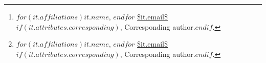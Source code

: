\author{
  $for(by-author/allbutlast)$
 $it.name.literal$$if(it.orcid)$~$endif$
 \thanks{$for(it.affiliations)$$it.name$, $endfor$%
{\footnotesize \url{$it.email$}}$if(it.attributes.corresponding)$, Corresponding author.$endif$.},
 $endfor$
 $for(by-author/last)$
 $it.name.literal$$if(it.orcid)$~$endif$
 \thanks{$for(it.affiliations)$$it.name$, $endfor$%
{\footnotesize \url{$it.email$}}$if(it.attributes.corresponding)$, Corresponding author.$endif$.}
 $endfor$
 \\~
 }

\date{}


%
\usepackage{url}


\usepackage{fancyhdr}

\pagestyle{firststyle} 

